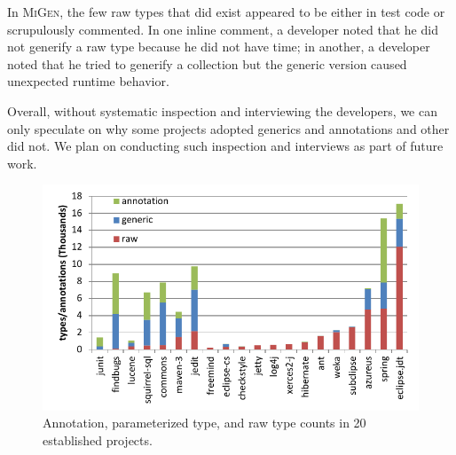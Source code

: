 \documentclass{svjour3}
\newcommand{\migen}{\textsc{MiGen}\xspace}
\begin{document}
In \migen, the few raw types that did exist appeared to be
either in test code or scrupulously commented.
In one inline comment, a developer
noted that he did not generify a raw type because he 
did not have time; in another, a developer noted that 
he tried to generify a collection but the generic version caused
unexpected runtime behavior.

Overall, without systematic inspection and interviewing the developers, we can only speculate on why 
some projects adopted generics and annotations and other did not.
We plan on conducting such inspection and interviews as part of future work.

 
\begin{figure}[htb]
	\centering
	\includegraphics[width=\columnwidth]{oldProjectsUsage}
	\caption{Annotation, parameterized type, and raw 
			type counts in 20 established projects.}
	\label{fig:oldProjectsUseOfGenerics}
\end{figure}
\end{document}
